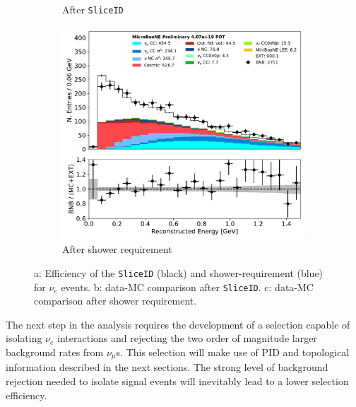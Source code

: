 \begin{figure}[H]
\begin{center}
\begin{subfigure}[b]{0.31\textwidth}
    \caption{\label{fig:nuereco:sliceid} After \texttt{SliceID}}
    \end{subfigure}
    \begin{subfigure}[b]{0.31\textwidth}
    \centering
    \includegraphics[width=1.00\textwidth]{nureco/reco_e_01152020.pdf}
    \caption{\label{fig:nuereco:shower} After shower requirement}
    \end{subfigure}
\caption{\label{fig:nuereco} a: Efficiency of the \texttt{SliceID} (black) and shower-requirement (blue) for $\nu_e$ events. b: data-MC comparison after \texttt{SliceID}. c: data-MC comparison after shower requirement. }
\end{center}
\end{figure}

\par The next step in the analysis requires the development of a selection capable of isolating $\nu_e$ interactions and rejecting the two order of magnitude larger background rates from $\nu_{\mu}$s. This selection will make use of PID and topological information described in the next sections. The strong level of background rejection needed to isolate signal events will inevitably lead to a lower selection efficiency.


